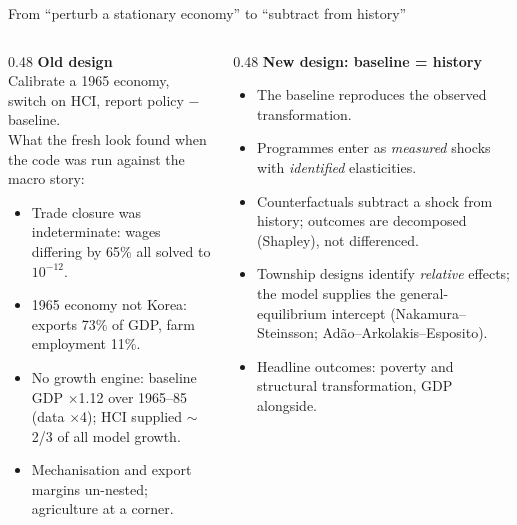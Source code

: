 \documentclass[10pt,aspectratio=169]{beamer}
\newcommand{\hl}[1]{\textcolor{mOrange}{#1}}
\begin{document}
\begin{frame}{From ``perturb a stationary economy'' to ``subtract from history''}
  \begin{columns}[T]
    \begin{column}{0.48\textwidth}
      \textbf{Old design}\\[0.2em]
      \footnotesize
      Calibrate a 1965 economy, switch on HCI, report policy $-$ baseline.\\[0.4em]
      What the fresh look found when the code was run against the macro story:
      \begin{itemize}\footnotesize
        \item Trade closure was \hl{indeterminate}: wages differing by 65\% all solved to
              $10^{-12}$.
        \item 1965 economy not Korea: exports 73\% of GDP, farm employment 11\%.
        \item \hl{No growth engine}: baseline GDP $\times$1.12 over 1965--85 (data $\times$4);
              HCI supplied $\sim$2/3 of all model growth.
        \item Mechanisation and export margins un-nested; agriculture at a corner.
      \end{itemize}
    \end{column}
    \begin{column}{0.48\textwidth}
      \textbf{New design: baseline = history}\\[0.2em]
      \footnotesize
      \begin{itemize}
        \item The baseline reproduces the observed transformation.
        \item Programmes enter as \emph{measured} shocks with \emph{identified}
              elasticities.
        \item Counterfactuals \hl{subtract} a shock from history; outcomes are decomposed
              (Shapley), not differenced.
        \item Township designs identify \emph{relative} effects; the model supplies the
              general-equilibrium \hl{intercept} (Nakamura--Steinsson; Ad\~ao--Arkolakis--Esposito).
        \item Headline outcomes: poverty and structural transformation, GDP alongside.
      \end{itemize}
    \end{column}
  \end{columns}
\end{frame}
\end{document}
